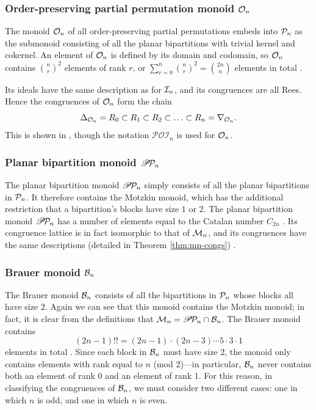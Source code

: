 \subsubsection{Order-preserving partial permutation monoid $\mathcal{O}_n$}
 The
monoid $\mathcal{O}_n$ of all order-preserving partial permutations embeds into $\mathcal{P}_n$
as the submonoid consisting of all the planar bipartitions with trivial kernel
and cokernel.  An element of $\mathcal{O}_n$ is defined by its domain and codomain, so
$\mathcal{O}_n$ contains $\binom{n}{r}^2$ elements of rank $r$, or
$\sum_{r=0}^n \binom{n}{r}^2 = \binom{2n}{n}$ elements in total
.

Its ideals have the same description as for $\mathcal{I}_n$, and
its congruences are all Rees.  Hence the congruences of $\mathcal{O}_n$ form the chain
$$\Delta_{\mathcal{O}_n} = R_0 \subset R_1 \subset R_2 \subset \ldots
\subset R_n = \nabla_{\mathcal{O}_n}.$$
This is shown in \cite[Proposition 2.6]{fernandes_2001}, though the notation
$\mathcal{POI}_n$ is used for $\mathcal{O}_n$.

\subsubsection{Planar bipartition monoid $\mathscr{P}\!\mathcal{P}_n$}
The planar bipartition monoid $\mathscr{P}\!\mathcal{P}_n$ simply consists of all the planar
bipartitions in $\mathcal{P}_n$.  It therefore contains the Motzkin monoid, which has
the additional restriction that a bipartition's blocks have size $1$ or $2$.
The planar bipartition monoid $\mathscr{P}\!\mathcal{P}_n$ has a number of elements equal to the
Catalan number $C_{2n}$ .  Its congruence lattice is in fact
isomorphic to that of $\mathcal{M}_n$, and its congruences have the same
descriptions (detailed in Theorem \ref{thm:mn-congs}) \cite[\S7]{ourpaper}.

\subsubsection{Brauer monoid $\mathcal{B}_n$}
The Brauer monoid $\mathcal{B}_n$ consists of all the bipartitions in $\mathcal{P}_n$ whose
blocks all have size $2$.  Again we can see that this monoid contains the
Motzkin monoid; in fact, it is clear from the definitions that
$\mathcal{M}_n = \mathscr{P}\!\mathcal{P}_n \cap \mathcal{B}_n$.
The Brauer monoid contains
$$(2n-1)!! = (2n-1) \cdot (2n-3)\cdots 5 \cdot 3 \cdot 1$$
elements in total .  Since each block in $\mathcal{B}_n$ must have
size $2$, the monoid only contains elements with rank equal to $n$ (mod
$2$)---in particular, $\mathcal{B}_n$ never contains both an element of rank $0$ and
an element of rank $1$.  For this reason, in classifying the congruences of
$\mathcal{B}_n$, we must consider two different cases: one in which $n$ is odd, and
one in which $n$ is even.

